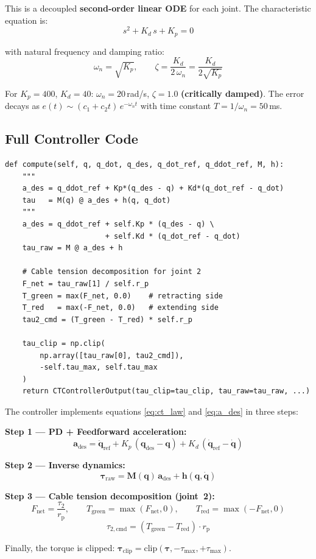 \documentclass[11pt,a4paper]{article}
\newcommand{\rp}{r_{\mathrm{p}}}
\newcommand{\bq}{\bm{q}}
\newcommand{\bdq}{\dot{\bm{q}}}
\newcommand{\bddq}{\ddot{\bm{q}}}
\newcommand{\btau}{\bm{\tau}}
\newcommand{\bM}{\bm{M}}
\newcommand{\bh}{\bm{h}}
\begin{document}
This is a decoupled \textbf{second-order linear ODE} for each joint. The characteristic equation is:
\begin{equation}
    s^2 + K_d\,s + K_p = 0
\end{equation}

with natural frequency and damping ratio:
\begin{equation}
\boxed{
    \omega_n = \sqrt{K_p}, \qquad \zeta = \frac{K_d}{2\,\omega_n} = \frac{K_d}{2\sqrt{K_p}}
}
\label{eq:gains}
\end{equation}

\begin{resultbox}
For $K_p = 400$, $K_d = 40$: $\omega_n = 20$\,rad/s, $\zeta = 1.0$ \textbf{(critically damped)}. The error decays as $e(t) \sim (c_1 + c_2 t)\,e^{-\omega_n t}$ with time constant $T = 1/\omega_n = 50$\,ms.
\end{resultbox}

\subsection{Full Controller Code}

\begin{lstlisting}[caption={Computed-torque law --- \texttt{rl/computed\_torque\_controller.py}}]
def compute(self, q, q_dot, q_des, q_dot_ref, q_ddot_ref, M, h):
    """
    a_des = q_ddot_ref + Kp*(q_des - q) + Kd*(q_dot_ref - q_dot)
    tau   = M(q) @ a_des + h(q, q_dot)
    """
    a_des = q_ddot_ref + self.Kp * (q_des - q) \
                       + self.Kd * (q_dot_ref - q_dot)
    tau_raw = M @ a_des + h

    # Cable tension decomposition for joint 2
    F_net = tau_raw[1] / self.r_p
    T_green = max(F_net, 0.0)    # retracting side
    T_red   = max(-F_net, 0.0)   # extending side
    tau2_cmd = (T_green - T_red) * self.r_p

    tau_clip = np.clip(
        np.array([tau_raw[0], tau2_cmd]),
        -self.tau_max, self.tau_max
    )
    return CTControllerOutput(tau_clip=tau_clip, tau_raw=tau_raw, ...)
\end{lstlisting}

\begin{codemath}
The controller implements equations \eqref{eq:ct_law} and \eqref{eq:a_des} in three steps:

\textbf{Step 1 --- PD + Feedforward acceleration:}
\[
    \bm{a}_{\mathrm{des}} = \bddq_{\mathrm{ref}} + K_p\,(\bq_{\mathrm{des}} - \bq) + K_d\,(\bdq_{\mathrm{ref}} - \bdq)
\]

\textbf{Step 2 --- Inverse dynamics:}
\[
    \btau_{\mathrm{raw}} = \bM(\bq)\,\bm{a}_{\mathrm{des}} + \bh(\bq, \bdq)
\]

\textbf{Step 3 --- Cable tension decomposition (joint~2):}
\[
    F_{\mathrm{net}} = \frac{\tau_2}{\rp}, \qquad
    T_{\mathrm{green}} = \max(F_{\mathrm{net}}, 0), \qquad
    T_{\mathrm{red}} = \max(-F_{\mathrm{net}}, 0)
\]
\[
    \tau_{2,\mathrm{cmd}} = (T_{\mathrm{green}} - T_{\mathrm{red}}) \cdot \rp
\]

Finally, the torque is clipped: $\btau_{\mathrm{clip}} = \mathrm{clip}(\btau, -\tau_{\max}, +\tau_{\max})$.
\end{codemath}
\end{document}
